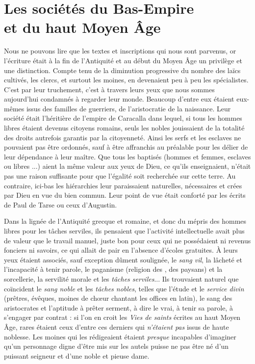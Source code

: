 

\chapter[Les sociétés du Bas-Empire et du haut Moyen Âge]{Les sociétés du Bas-Empire\\et du haut Moyen Âge}


 Nous ne pouvons lire que les textes et inscriptions qui nous sont parvenus, or l'écriture était à la fin de l'Antiquité et au début du Moyen Âge un privilège et une distinction. Compte tenu de la diminution progressive du nombre des laïcs cultivés, les clercs, et surtout les moines, en devenaient peu à peu les spécialistes. C'est par leur truchement, c'est à travers leurs yeux que nous sommes aujourd'hui condamnés à regarder leur monde. Beaucoup d'entre eux étaient eux-mêmes issus des familles de guerriers, de l'aristocratie de la naissance. Leur société était l'héritière de l'empire de Caracalla dans lequel, si tous les hommes libres étaient devenus citoyens romains, seuls les nobles  jouissaient de la totalité des droits autrefois garantis par la citoyenneté. Ainsi les serfs et les esclaves ne pouvaient pas être ordonnés, sauf à être affranchis au préalable pour les délier de leur dépendance à leur maître. Que tous les baptisés (hommes et femmes, esclaves ou libres ...) aient la même valeur aux yeux de Dieu, ce qu'ils enseignaient, n'était pas une raison suffisante pour que l'égalité soit recherchée sur cette terre. Au contraire, ici-bas les hiérarchies leur paraissaient naturelles, nécessaires et crées par Dieu en vue du bien commun. Leur point de vue était conforté par les écrits de Paul de Tarse ou ceux d'Augustin.

 Dans la lignée de l'Antiquité grecque et romaine, et donc du mépris des hommes libres pour les tâches serviles, ils pensaient que l'activité intellectuelle avait plus de valeur que le travail manuel, juste bon pour ceux qui ne possédaient ni revenus fonciers ni savoirs, ce qui allait de pair en l'absence d'écoles gratuites. À leurs yeux étaient associés, sauf exception dûment soulignée, le \emph{sang vil}, la lâcheté et l'incapacité à tenir parole, le paganisme (religion des , des paysans) et la sorcellerie, la servilité morale et les \emph{tâches serviles}... Ils trouvaient naturel que coïncident le \emph{sang noble} et les \emph{tâches nobles}, telles que l'étude et le \emph{service divin} (prêtres, évêques, moines de chœur chantant les offices en latin), le sang des aristocrates et l'aptitude à prêter serment, à dire le vrai, à tenir sa parole, à s'engager par contrat : si l'on en croit les \emph{Vies de saints} écrites au haut Moyen Âge, rares étaient ceux d'entre ces derniers qui \emph{n'étaient pas} issus de haute noblesse. Les moines qui les rédigeaient étaient \emph{presque} incapables d'imaginer qu'un personnage digne d'être mis sur les autels puisse ne pas être né d'un puissant seigneur et d'une noble et pieuse dame. 

